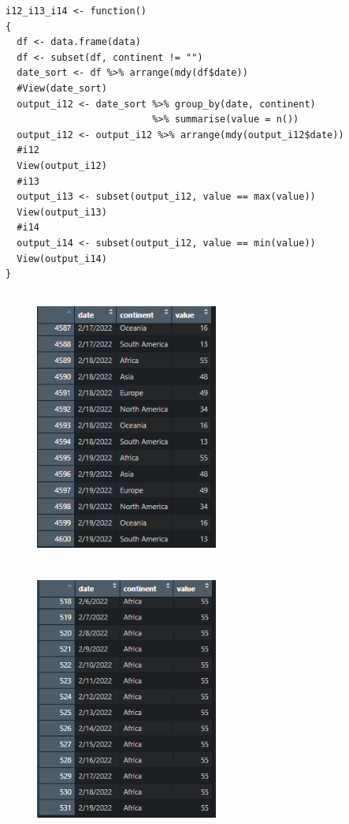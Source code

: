 \documentclass[a4paper]{article}
\theoremstyle{definition}
\begin{document}
\begin{enumerate}[i)]
\begin{enumerate}[1)]
		\begin{lstlisting}[frame=single]  
i12_i13_i14 <- function()
{
  df <- data.frame(data)
  df <- subset(df, continent != "")
  date_sort <- df %>% arrange(mdy(df$date))
  #View(date_sort)
  output_i12 <- date_sort %>% group_by(date, continent) 
                          %>% summarise(value = n())
  output_i12 <- output_i12 %>% arrange(mdy(output_i12$date))
  #i12
  View(output_i12)
  #i13
  output_i13 <- subset(output_i12, value == max(value))
  View(output_i13)
  #i14
  output_i14 <- subset(output_i12, value == min(value))
  View(output_i14)
}
	\end{lstlisting}
	
	\begin{figure}[h!]
		\begin{center}
		    \includegraphics[width=6cm,height=9cm]{Images/I/I12.png}
		    \includegraphics[width=6cm,height=9cm]{Images/I/I13.png}

\end{center}
\end{figure}
\end{enumerate}
\end{enumerate}
\end{document}

